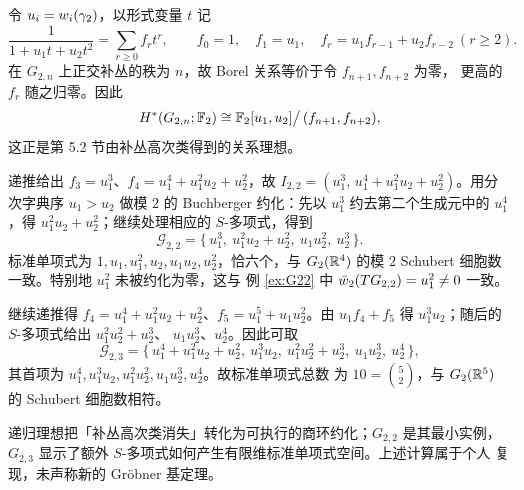 令 $u_i=w_i(\gamma_2)$，以形式变量 $t$ 记
\begin{equation*}
  \frac{1}{1+u_1t+u_2t^{2}}=\sum_{r\ge0} f_r t^{r},
  \qquad
  f_0=1,\quad f_1=u_1,\quad f_r=u_1f_{r-1}+u_2f_{r-2}\ (r\ge2).
\end{equation*}
在 $G_{2,n}$ 上正交补丛的秩为 $n$，故 Borel 关系等价于令 $f_{n+1},f_{n+2}$ 为零，
更高的 $f_r$ 随之归零。因此
\begin{equation*}
  H^{*}(G_{2,n};\mathbb{F}_2)\cong\mathbb{F}_2[u_1,u_2]\big/\,(f_{n+1},f_{n+2}),
\end{equation*}
这正是第 5.2 节由补丛高次类得到的关系理想。

\begin{example}[$G_{2,2}$ 的逐项对照]\label{ex:G22-grobner}
递推给出 $f_3=u_1^{3}$、$f_4=u_1^{4}+u_1^{2}u_2+u_2^{2}$，故
$I_{2,2}=(u_1^{3},\,u_1^{4}+u_1^{2}u_2+u_2^{2})$。用分次字典序 $u_1>u_2$ 做模
$2$ 的 Buchberger 约化：先以 $u_1^{3}$ 约去第二个生成元中的 $u_1^{4}$，得
$u_1^{2}u_2+u_2^{2}$；继续处理相应的 $S$-多项式，得到
\begin{equation*}
  \mathcal{G}_{2,2}=\bigl\{\,u_1^{3},\ u_1^{2}u_2+u_2^{2},\ u_1u_2^{2},\
  u_2^{3}\,\bigr\}.
\end{equation*}
标准单项式为 $1,u_1,u_1^{2},u_2,u_1u_2,u_2^{2}$，恰六个，与
$G_2(\mathbb{R}^{4})$ 的模 $2$ Schubert 细胞数一致。特别地 $u_1^{2}$ 未被约化为零，这与
例 \ref{ex:G22} 中 $\bar w_2(TG_{2,2})=u_1^{2}\neq0$ 一致。
\end{example}

\begin{example}[$G_{2,3}$ 的附加交叉检查]\label{ex:G23}
继续递推得 $f_4=u_1^{4}+u_1^{2}u_2+u_2^{2}$、$f_5=u_1^{5}+u_1u_2^{2}$。由
$u_1f_4+f_5$ 得 $u_1^{3}u_2$；随后的 $S$-多项式给出 $u_1^{2}u_2^{2}+u_2^{3}$、
$u_1u_2^{3}$、$u_2^{4}$。因此可取
\begin{equation*}
  \mathcal{G}_{2,3}=\bigl\{\,u_1^{4}+u_1^{2}u_2+u_2^{2},\ u_1^{3}u_2,\
  u_1^{2}u_2^{2}+u_2^{3},\ u_1u_2^{3},\ u_2^{4}\,\bigr\},
\end{equation*}
其首项为 $u_1^{4},u_1^{3}u_2,u_1^{2}u_2^{2},u_1u_2^{3},u_2^{4}$。故标准单项式总数
为 $10=\binom{5}{2}$，与 $G_2(\mathbb{R}^{5})$ 的 Schubert 细胞数相符。
\end{example}

\begin{remark}
递归理想把「补丛高次类消失」转化为可执行的商环约化；$G_{2,2}$ 是其最小实例，
$G_{2,3}$ 显示了额外 $S$-多项式如何产生有限维标准单项式空间。上述计算属于个人
复现，未声称新的 Gr\"obner 基定理。
\end{remark}

